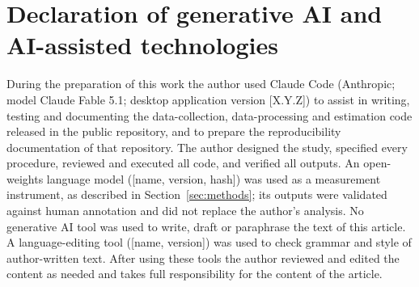 
\section*{Declaration of generative AI and AI-assisted technologies}
During the preparation of this work the author used Claude Code (Anthropic; model
Claude Fable 5.1; desktop application version [X.Y.Z]) to assist in writing, testing
and documenting the data-collection, data-processing and estimation code released in
the public repository, and to prepare the reproducibility documentation of that
repository. The author designed the study, specified every procedure, reviewed and
executed all code, and verified all outputs.
An open-weights language model ([name, version, hash]) was used as a measurement
instrument, as described in Section~\ref{sec:methods}; its outputs were validated
against human annotation and did not replace the author's analysis.
No generative AI tool was used to write, draft or paraphrase the text of this article.
A language-editing tool ([name, version]) was used to check grammar and style of
author-written text.
After using these tools the author reviewed and edited the content as needed and takes
full responsibility for the content of the article.

